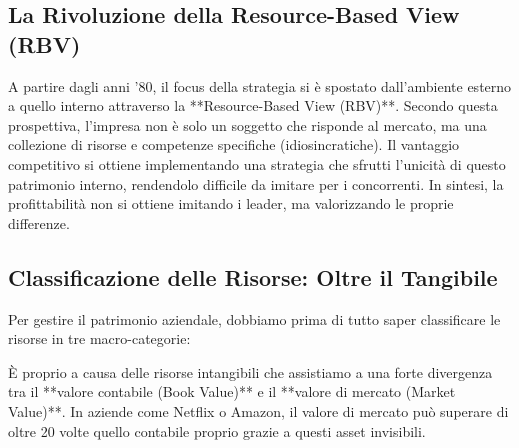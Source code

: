 \documentclass[a4paper,10pt]{article}
\begin{document}
\subsection*{La Rivoluzione della Resource-Based View (RBV)}

A partire dagli anni '80, il focus della strategia si è spostato dall'ambiente esterno a quello interno attraverso la **Resource-Based View (RBV)**. Secondo questa prospettiva, l'impresa non è solo un soggetto che risponde al mercato, ma una collezione di risorse e competenze specifiche (idiosincratiche). Il vantaggio competitivo si ottiene implementando una strategia che sfrutti l'unicità di questo patrimonio interno, rendendolo difficile da imitare per i concorrenti. In sintesi, la profittabilità non si ottiene imitando i leader, ma valorizzando le proprie differenze.

\subsection*{Classificazione delle Risorse: Oltre il Tangibile}

Per gestire il patrimonio aziendale, dobbiamo prima di tutto saper classificare le risorse in tre macro-categorie:

\begin{table}[H]
\setlength{\extrarowheight}{10pt}
\caption{Classificazione delle risorse organizzative}
\end{table}

È proprio a causa delle risorse intangibili che assistiamo a una forte divergenza tra il **valore contabile (Book Value)** e il **valore di mercato (Market Value)**. In aziende come Netflix o Amazon, il valore di mercato può superare di oltre 20 volte quello contabile proprio grazie a questi asset invisibili.
\end{document}
